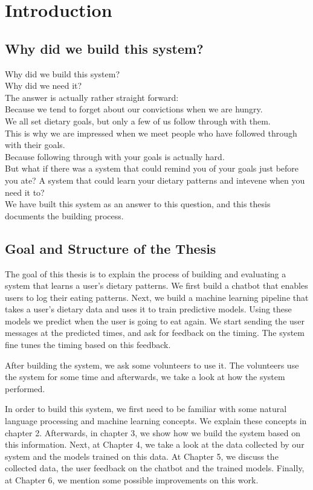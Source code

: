 
\chapter{Introduction}\label{chapter:introduction}

\section{Why did we build this system?}
Why did we build this system?\\ 
Why did we need it?\\
The answer is actually rather straight forward:\\
Because we tend to forget about our convictions when we are hungry.\\
We all set dietary goals, but only a few of us follow through with them.\\
This is why we are impressed when we meet people who have followed through with their goals.\\
Because following through with your goals is actually hard.\\
But what if there was a system that could remind you of your goals just before you ate?
A system that could learn your dietary patterns and intevene when you need it to?\\
We have built this system as an answer to this question, and this thesis documents the building process.

\section{Goal and Structure of the Thesis}
The goal of this thesis is to explain the process of building and evaluating a system that learns a user's dietary patterns.
We first build a chatbot that enables users to log their eating patterns.
Next, we build a machine learning pipeline that takes a user's dietary data and uses it to train predictive models.
Using these models we predict when the user is going to eat again.
We start sending the user messages at the predicted times, and ask for feedback on the timing.
The system fine tunes the timing based on this feedback.

After building the system, we ask some volunteers to use it.
The volunteers use the system for some time and afterwards, we take a look at how the system performed.

In order to build this system, we first need to be familiar with some natural language processing and machine learning concepts.
We explain these concepts in chapter 2.
Afterwards, in chapter 3, we show how we build the system based on this information.
Next, at Chapter 4, we take a look at the data collected by our system and the models trained on this data.
At Chapter 5, we discuss the collected data, the user feedback on the chatbot and the trained models.
Finally, at Chapter 6, we mention some possible improvements on this work.

